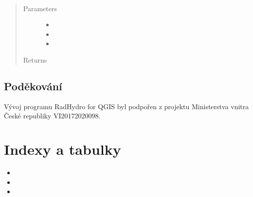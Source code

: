 \documentclass[letterpaper,10pt,english]{sphinxmanual}
\begin{document}
\begin{fulllineitems}
\begin{fulllineitems}
\end{fulllineitems}


\begin{fulllineitems}
\label{\detokenize{libs:sowing_proc.SowingProcTimeSeries.predictSowingProc}}~\begin{quote}\begin{description}
\item[{Parameters}] \leavevmode\begin{itemize}
\item {} 
 \textendash{} 

\item {} 
 \textendash{} 

\item {} 
 \textendash{} 

\end{itemize}

\item[{Returns}] \leavevmode


\end{description}\end{quote}

\end{fulllineitems}


\end{fulllineitems}



\section{Poděkování}
\label{\detokenize{ackn:podekovani}}\label{\detokenize{ackn::doc}}
Vývoj programu RadHydro for QGIS byl podpořen z projektu Ministerstva  vnitra
České republiky VI20172020098.

\noindent{}


\chapter{Indexy a tabulky}
\label{\detokenize{index:indexy-a-tabulky}}\begin{itemize}
\item {} 

\item {} 

\item {} 

\end{itemize}
\end{document}

